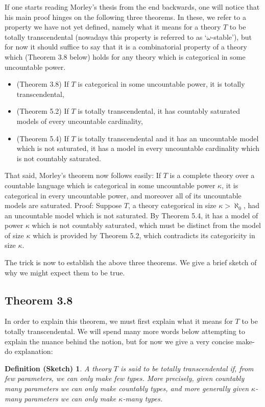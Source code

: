 \documentclass{article}
\newtheorem{defsketch}[theorem]{Definition (Sketch)}
\theoremstyle{nonumberplain}
\begin{document}
If one starts reading Morley's thesis from the end backwards, one will notice that his main proof hinges on the following three theorems. In these, we refer to a property we have not yet defined, namely what it means for a theory $T$ to be totally transcendental (nowadays this property is referred to as `$\omega$-stable'), but for now it should suffice to say that it is a combinatorial property of a theory which (Theorem 3.8 below) holds for any theory which is categorical in some uncountable power.

\begin{itemize}
\item (Theorem 3.8) If $T$ is categorical in some uncountable power, it is totally transcendental,
\item (Theorem 5.2) If $T$ is totally transcendental, it has countably saturated models of every uncountable cardinality,
\item (Theorem 5.4) If $T$ is totally transcendental and it has an uncountable model which is not saturated, it has a model in every uncountable cardinality which is not countably saturated.
\end{itemize}

That said, Morley's theorem now follows easily: If $T$ is a complete theory over a countable language which is categorical in some uncountable power $\kappa$, it is categorical in every uncountable power, and moreover all of its uncountable models are saturated. Proof: Suppose $T$, a theory categorical in size $\kappa > \aleph_0$, had an uncountable model which is not saturated. By Theorem 5.4, it has a model of power $\kappa$ which is not countably saturated, which must be distinct from the model of size $\kappa$ which is provided by Theorem 5.2, which contradicts its categoricity in size $\kappa$.

The trick is now to establish the above three theorems. We give a brief sketch of why we might expect them to be true.

\subsection{Theorem 3.8}

In order to explain this theorem, we must first explain what it means for $T$ to be totally transcendental. We will spend many more words below attempting to explain the nuance behind the notion, but for now we give a very concise make-do explanation:
\begin{defsketch}\label{defsketch:tt}
A theory $T$ is said to be totally transcendental if, from few parameters, we can only make few types. More precisely, given countably many parameters we can only make countably types, and more generally given $\kappa$-many parameters we can only make $\kappa$-many types.
\end{defsketch}
\end{document}
